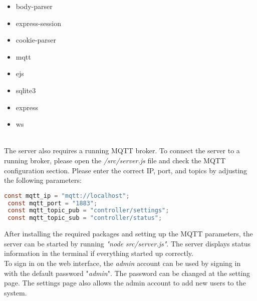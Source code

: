 \begin{minipage}[t]{.1\textwidth} 
\end{minipage}%
\begin{minipage}[t]{.25\textwidth}
    \begin{itemize}\itemsep0pt
        \item body-parser
        \item express-session
    \end{itemize}   
\end{minipage}%
\begin{minipage}[t]{.25\textwidth}
        \begin{itemize}\itemsep0pt
        \item cookie-parser
        \item mqtt
    \end{itemize}
\end{minipage}%
\begin{minipage}[t]{.15\textwidth}
        \begin{itemize}\itemsep0pt
        \item ejs
        \item sqlite3
    \end{itemize}
\end{minipage}%
\begin{minipage}[t]{.25\textwidth}
        \begin{itemize}\itemsep0pt
        \item express
        \item ws
    \end{itemize}
\end{minipage}%
\\

The server also requires a running MQTT broker. To connect the server to a running broker, please open the \textit{/src/server.js} file and check the MQTT configuration section. Please enter the correct IP, port, and topics by adjusting the following parameters:

\begin{lstlisting}[language = Java, numbers = none]
 const mqtt_ip = "mqtt://localhost";
 const mqtt_port = "1883";
 const mqtt_topic_pub = "controller/settings";
 const mqtt_topic_sub = "controller/status";
\end{lstlisting}

After installing the required packages and setting up the MQTT parameters, the server can be started by running \textit{"node src/server.js"}. The server displays status information in the terminal if everything started up correctly.\\

To sign in on the web interface, the \textit{admin} account can be used by signing in with the default password "\textit{admin}". The password can be changed at the setting page. The settings page also allows the admin account to add new users to the system.